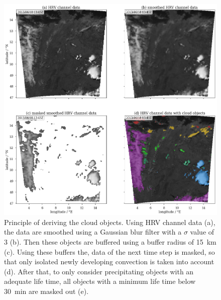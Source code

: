\begin{figure}[htbp]
\centering
\includegraphics[width=\textwidth]{Grafiken/Abbildungen/wolkenobjektprinzip.png}
\caption{Principle of deriving the cloud objects. Using HRV channel data (a), the data are smoothed using a Gaussian blur filter with a $\sigma$ value of 3 (b). Then these objects are buffered using a buffer radius of \SI{15}{\kilo\metre} (c). Using these buffers the, data of the next time step is masked, so that only isolated newly developing convection is taken into account (d). After that, to only consider precipitating objects with an adequate life  time, all objects with a minimum life time below \SI{30}{min} are masked out (e).}
\label{fig:hrv_seg}
\end{figure}

